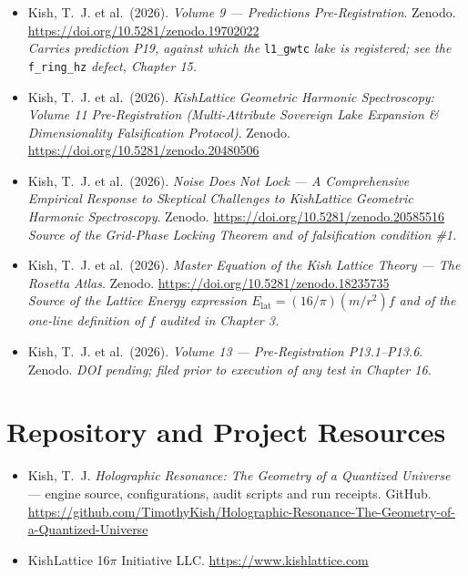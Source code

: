\documentclass[11pt, letterpaper, openany]{book}
\begin{document}
\begin{itemize}
    \item Kish, T.~J. et al.\ (2026). \textit{Volume 9 --- Predictions Pre-Registration}.
          Zenodo. \url{https://doi.org/10.5281/zenodo.19702022}
          \\ \textit{Carries prediction P19, against which the} \texttt{l1\_gwtc}
          \textit{lake is registered; see the} \texttt{f\_ring\_hz} \textit{defect,
          Chapter 15.}
    \item Kish, T.~J. et al.\ (2026). \textit{KishLattice Geometric Harmonic Spectroscopy:
          Volume 11 Pre-Registration (Multi-Attribute Sovereign Lake Expansion \&
          Dimensionality Falsification Protocol)}.
          Zenodo. \url{https://doi.org/10.5281/zenodo.20480506}
    \item Kish, T.~J. et al.\ (2026). \textit{Noise Does Not Lock --- A Comprehensive
          Empirical Response to Skeptical Challenges to KishLattice Geometric Harmonic
          Spectroscopy}. Zenodo. \url{https://doi.org/10.5281/zenodo.20585516}
          \\ \textit{Source of the Grid-Phase Locking Theorem and of falsification
          condition \#1.}
    \item Kish, T.~J. et al.\ (2026). \textit{Master Equation of the Kish Lattice Theory ---
          The Rosetta Atlas}. Zenodo. \url{https://doi.org/10.5281/zenodo.18235735}
          \\ \textit{Source of the Lattice Energy expression $E_{\mathrm{lat}} =
          (16/\pi)(m/r^2)f$ and of the one-line definition of $f$ audited in Chapter 3.}
    \item Kish, T.~J. et al.\ (2026). \textit{Volume 13 --- Pre-Registration P13.1--P13.6}.
          Zenodo. \textit{DOI pending; filed prior to execution of any test in Chapter 16.}
\end{itemize}

\section*{Repository and Project Resources}

\begin{itemize}
    \item Kish, T.~J. \textit{Holographic Resonance: The Geometry of a Quantized Universe} ---
          engine source, configurations, audit scripts and run receipts. GitHub.
          \url{https://github.com/TimothyKish/Holographic-Resonance-The-Geometry-of-a-Quantized-Universe}
    \item KishLattice 16$\pi$ Initiative LLC. \url{https://www.kishlattice.com}
\end{itemize}
\end{document}
